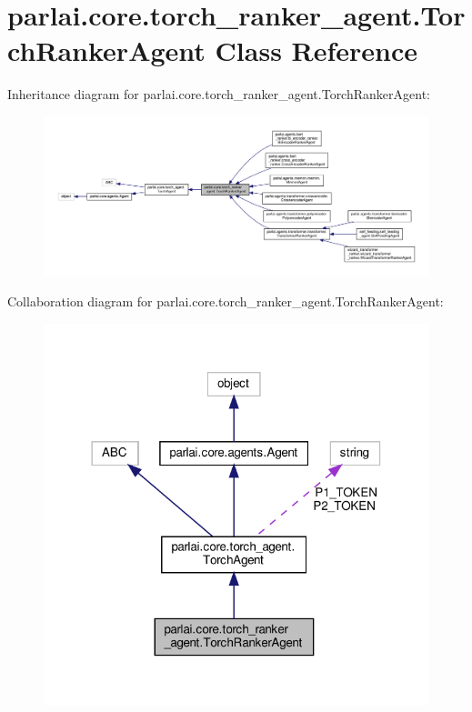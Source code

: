 \hypertarget{classparlai_1_1core_1_1torch__ranker__agent_1_1TorchRankerAgent}{}\section{parlai.\+core.\+torch\+\_\+ranker\+\_\+agent.\+Torch\+Ranker\+Agent Class Reference}
\label{classparlai_1_1core_1_1torch__ranker__agent_1_1TorchRankerAgent}


Inheritance diagram for parlai.\+core.\+torch\+\_\+ranker\+\_\+agent.\+Torch\+Ranker\+Agent\+:
\nopagebreak
\begin{figure}[H]
\begin{center}
\leavevmode
\includegraphics[width=350pt]{classparlai_1_1core_1_1torch__ranker__agent_1_1TorchRankerAgent__inherit__graph}
\end{center}
\end{figure}


Collaboration diagram for parlai.\+core.\+torch\+\_\+ranker\+\_\+agent.\+Torch\+Ranker\+Agent\+:
\nopagebreak
\begin{figure}[H]
\begin{center}
\leavevmode
\includegraphics[width=318pt]{classparlai_1_1core_1_1torch__ranker__agent_1_1TorchRankerAgent__coll__graph}
\end{center}
\end{figure}
